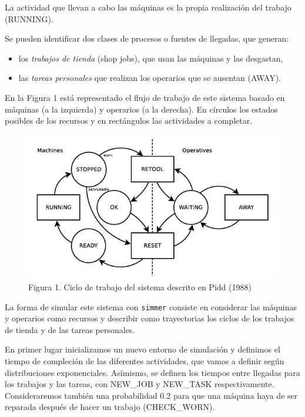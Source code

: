 \documentclass[
]{book}
\providecommand{\tightlist}{%
  \setlength{\itemsep}{0pt}\setlength{\parskip}{0pt}}
\theoremstyle{definition}
\theoremstyle{definition}
\theoremstyle{definition}
\theoremstyle{definition}
\theoremstyle{remark}
\begin{document}
La actividad que llevan a cabo las máquinas es la propia realización del trabajo (RUNNING).

Se pueden identificar dos clases de procesos o fuentes de llegadas, que generan:

\begin{itemize}
\tightlist
\item
  los \emph{trabajos de tienda} (shop jobs), que usan las máquinas y las desgastan,
\item
  las \emph{tareas personales} que realizan los operarios que se ausentan (AWAY).
\end{itemize}

En la Figura 1 está representado el flujo de trabajo de este sistema basado en máquinas (a la izquierda) y operarios (a la derecha). En círculos los estados posibles de los recursos y en rectángulos las actividades a completar.

\begin{figure}

{\centering \includegraphics[width=0.8\linewidth]{images/job-cycle} 

}

\caption{Figura 1. Ciclo de trabajo del sistema descrito en Pidd (1988)}\label{fig:job-cycle}
\end{figure}

La forma de simular este sistema con \texttt{simmer} consiste en considerar las máquinas y operarios como recursos y describir como trayectorias los ciclos de los trabajos de tienda y de las tareas personales.

En primer lugar inicializamos un nuevo entorno de simulación y definimos el tiempo de compleción de las diferentes actividades, que vamos a definir según distribuciones exponenciales. Asímismo, se definen los tiempos entre llegadas para los trabajos y las tareas, con NEW\_JOB y NEW\_TASK respectivamente. Consideraremos también una probabilidad 0.2 para que una máquina haya de ser reparada después de hacer un trabajo (CHECK\_WORN).
\end{document}
